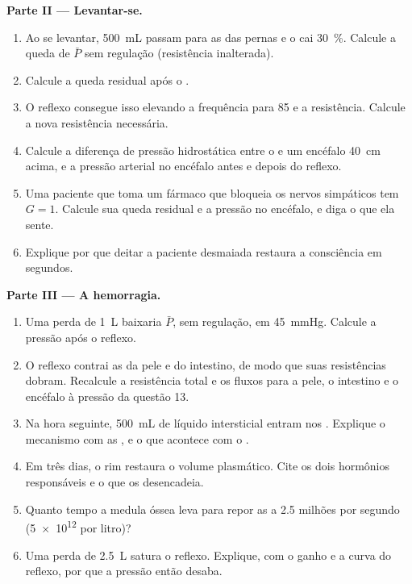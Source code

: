 \begin{problem}
\medskip
\noindent\textbf{Parte II --- Levantar-se.}
\begin{enumerate}[resume]
  \item Ao se levantar, \qty{500}{mL} passam para as  das pernas e
        o  cai \qty{30}{\%}. Calcule a queda de $\bar P$
        sem regulação (resistência inalterada).
  \item Calcule a queda residual após o .
  \item O reflexo consegue isso elevando a frequência para 85 e a
        resistência. Calcule a nova resistência necessária.
  \item Calcule a diferença de pressão hidrostática entre o  e um
        encéfalo \qty{40}{cm} acima, e a pressão arterial no encéfalo
        antes e depois do reflexo.
  \item Uma paciente que toma um fármaco que bloqueia os nervos
        simpáticos tem $G = 1$. Calcule sua queda residual e a pressão
        no encéfalo, e diga o que ela sente.
  \item Explique por que deitar a paciente desmaiada restaura a
        consciência em segundos.
\end{enumerate}

\medskip
\noindent\textbf{Parte III --- A hemorragia.}
\begin{enumerate}[resume]
  \item Uma perda de \qty{1}{L} baixaria $\bar P$, sem regulação, em
        \qty{45}{mmHg}. Calcule a pressão após o reflexo.
  \item O reflexo contrai as  da pele e do intestino, de modo
        que suas resistências dobram. Recalcule a resistência total e os
        fluxos para a pele, o intestino e o encéfalo à pressão da
        questão 13.
  \item Na hora seguinte, \qty{500}{mL} de líquido intersticial entram
        nos . Explique o mecanismo com as , e
        o que acontece com o .
  \item Em três dias, o rim restaura o volume plasmático. Cite os dois
        hormônios responsáveis e o que os desencadeia.
  \item Quanto tempo a medula óssea leva para repor as  a
        \num{2.5} milhões por segundo (\num{5e12} por litro)?
  \item Uma perda de \qty{2.5}{L} satura o reflexo. Explique, com o
        ganho e a curva do reflexo, por que a pressão então desaba.
\end{enumerate}


\end{problem}
